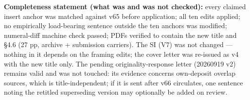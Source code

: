 \documentclass[11pt]{article}
\begin{document}
\textbf{Completeness statement (what was and was not checked):} every
claimed insert anchor was matched against v65 before application; all
ten edits applied; no empirically load-bearing sentence outside the ten
anchors was modified; numeral-diff machine check passed; PDFs verified
to contain the new title and §4.6 (27 pp, archive + submission
carriers). The SI (V7) was not changed --- nothing in it depends on the
framing edits; the cover letter was re-issued as v4 with the new title
only. The pending originality-response letter (20260919 v2) remains
valid and was not touched: its evidence concerns own-deposit overlap
sources, which is title-independent; if it is sent after v66 circulates,
one sentence noting the retitled superseding version may optionally be
added on review.
\end{document}
